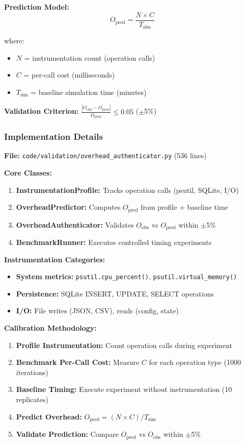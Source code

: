 \documentclass[11pt]{article}
\begin{document}
\textbf{Prediction Model:}
\begin{equation}
O_{\text{pred}} = \frac{N \times C}{T_{\text{sim}}}
\end{equation}

where:
\begin{itemize}
\item $N$ = instrumentation count (operation calls)
\item $C$ = per-call cost (milliseconds)
\item $T_{\text{sim}}$ = baseline simulation time (minutes)
\end{itemize}

\textbf{Validation Criterion:} $\frac{|O_{\text{obs}} - O_{\text{pred}}|}{O_{\text{pred}}} \leq 0.05$ ($\pm$5\%)

\subsubsection{Implementation Details}

\textbf{File:} \texttt{code/validation/overhead\_authenticator.py} (536 lines)

\textbf{Core Classes:}
\begin{enumerate}
\item \textbf{InstrumentationProfile:} Tracks operation calls (psutil, SQLite, I/O)
\item \textbf{OverheadPredictor:} Computes $O_{\text{pred}}$ from profile + baseline time
\item \textbf{OverheadAuthenticator:} Validates $O_{\text{obs}}$ vs $O_{\text{pred}}$ within $\pm$5\%
\item \textbf{BenchmarkRunner:} Executes controlled timing experiments
\end{enumerate}

\textbf{Instrumentation Categories:}
\begin{itemize}
\item \textbf{System metrics:} \texttt{psutil.cpu\_percent()}, \texttt{psutil.virtual\_memory()}
\item \textbf{Persistence:} SQLite INSERT, UPDATE, SELECT operations
\item \textbf{I/O:} File writes (JSON, CSV), reads (config, state)
\end{itemize}

\textbf{Calibration Methodology:}
\begin{enumerate}
\item \textbf{Profile Instrumentation:} Count operation calls during experiment
\item \textbf{Benchmark Per-Call Cost:} Measure $C$ for each operation type (1000 iterations)
\item \textbf{Baseline Timing:} Execute experiment without instrumentation (10 replicates)
\item \textbf{Predict Overhead:} $O_{\text{pred}} = (N \times C) / T_{\text{sim}}$
\item \textbf{Validate Prediction:} Compare $O_{\text{pred}}$ vs $O_{\text{obs}}$ within $\pm$5\%
\end{enumerate}
\end{document}

